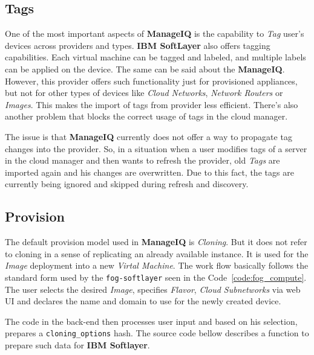\subsection{Tags}
\label{sub:Tags}

One of the most important aspects of \textbf{ManageIQ} is the capability to \emph{Tag} user's devices across providers and types. \textbf{IBM SoftLayer} also offers tagging capabilities. Each virtual machine can be tagged and labeled, and multiple labels can be applied on the device. The same can be said about the \textbf{ManageIQ}. However, this provider offers such functionality just for provisioned appliances, but not for other types of devices like \emph{Cloud Networks}, \emph{Network Routers} or \emph{Images}. This makes the import of tags from provider less efficient. There's also another problem that blocks the correct usage of tags in the cloud manager.

The issue is that \textbf{ManageIQ} currently does not offer a way to propagate tag changes into the provider. So, in a situation when a user modifies tags of a server in the cloud manager and then wants to refresh the provider, old \emph{Tags} are imported again and his changes are overwritten. Due to this fact, the tags are currently being ignored and skipped during refresh and discovery.

\clearpage
\subsection{Provision}
\label{sub:Provision}

The default provision model used in \textbf{ManageIQ} is \emph{Cloning}. But it does not refer to cloning in a sense of replicating an already available instance. It is used for the \emph{Image} deployment into a new \emph{Virtal Machine}.
The work flow basically follows the standard form used by the \texttt{fog-softlayer} seen in the Code~\ref{code:fog_compute}. The user selects the desired \emph{Image}, specifies \emph{Flavor}, \emph{Cloud Subnetworks} via web UI and declares the name and domain to use for the newly created device.

The code in the back-end then processes user input and based on his selection, prepares a \verb|cloning_options| hash. The source code bellow describes a function to prepare such data for \textbf{IBM Softlayer}.

